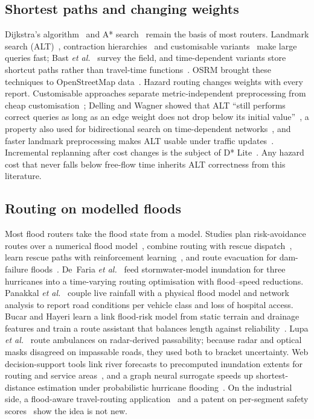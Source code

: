 \documentclass[journal]{IEEEtran}
\begin{document}
\subsection{Shortest paths and changing weights}
Dijkstra's algorithm~\cite{dijkstra1959note} and A* search~\cite{hart1968astar} remain the basis of most routers. Landmark search (ALT)~\cite{goldberg2005alt}, contraction hierarchies~\cite{geisberger2008ch} and customisable variants~\cite{dibbelt2016cch,delling2017crp} make large queries fast; Bast \emph{et al.}~\cite{bast2016route} survey the field, and time-dependent variants store shortcut paths rather than travel-time functions~\cite{strasser2021catchup}. OSRM brought these techniques to OpenStreetMap data~\cite{luxen2011osrm,haklay2008osm}. Hazard routing changes weights with every report. Customisable approaches separate metric-independent preprocessing from cheap customisation~\cite{dibbelt2016cch,delling2017crp}; Delling and Wagner showed that ALT ``still performs correct queries as long as an edge weight does not drop below its initial value''~\cite{delling2007landmark}, a property also used for bidirectional search on time-dependent networks~\cite{nannicini2012bidir}, and faster landmark preprocessing makes ALT usable under traffic updates~\cite{efentakis2013alt}. Incremental replanning after cost changes is the subject of D* Lite~\cite{koenig2005dstarlite}. Any hazard cost that never falls below free-flow time inherits ALT correctness from this literature.

\subsection{Routing on modelled floods}
Most flood routers take the flood state from a model. Studies plan risk-avoidance routes over a numerical flood model~\cite{li2023dijkstra}, combine routing with rescue dispatch~\cite{liang2025rescue}, learn rescue paths with reinforcement learning~\cite{li2025drl}, and route evacuation for dam-failure floods~\cite{an2025dam}. De~Faria \emph{et al.}~\cite{defaria2026routing} feed stormwater-model inundation for three hurricanes into a time-varying routing optimisation with flood--speed reductions. Panakkal \emph{et al.}~\cite{panakkal2023safer} couple live rainfall with a physical flood model and network analysis to report road conditions per vehicle class and loss of hospital access. Bucar and Hayeri learn a link flood-risk model from static terrain and drainage features and train a route assistant that balances length against reliability~\cite{bucar2022route}. Lupa \emph{et al.}~\cite{lupa2026stars} route ambulances on radar-derived passability; because radar and optical masks disagreed on impassable roads, they used both to bracket uncertainty. Web decision-support tools link river forecasts to precomputed inundation extents for routing and service areas~\cite{alabbad2024web}, and a graph neural surrogate speeds up shortest-distance estimation under probabilistic hurricane flooding~\cite{liu2025gnn}. On the industrial side, a flood-aware travel-routing application~\cite{ibm2013patent} and a patent on per-segment safety scores~\cite{uber2020patent} show the idea is not new.
\end{document}
